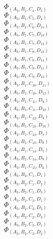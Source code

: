 \documentclass[14pt]{article}
\begin{document}
    $\Phi_{({A}_{3}, {B}_{1}, {C}_{4}, {D}_{5})}$ \\ 
    $\Phi_{({A}_{3}, {B}_{1}, {C}_{5}, {D}_{4})}$ \\ 
    $\Phi_{({A}_{3}, {B}_{1}, {C}_{6}, {D}_{15})}$ \\ 
    $\Phi_{({A}_{3}, {B}_{1}, {C}_{7}, {D}_{13})}$ \\ 
    $\Phi_{({A}_{3}, {B}_{1}, {C}_{7}, {D}_{14})}$ \\ 
    $\Phi_{({A}_{3}, {B}_{1}, {C}_{8}, {D}_{13})}$ \\ 
    $\Phi_{({A}_{3}, {B}_{1}, {C}_{8}, {D}_{14})}$ \\ 
    $\Phi_{({A}_{3}, {B}_{1}, {C}_{9}, {D}_{11})}$ \\ 
    $\Phi_{({A}_{3}, {B}_{1}, {C}_{9}, {D}_{12})}$ \\ 
    $\Phi_{({A}_{3}, {B}_{1}, {C}_{10}, {D}_{11})}$ \\ 
    $\Phi_{({A}_{3}, {B}_{1}, {C}_{10}, {D}_{12})}$ \\ 
    $\Phi_{({A}_{3}, {B}_{1}, {C}_{11}, {D}_{9})}$ \\ 
    $\Phi_{({A}_{3}, {B}_{1}, {C}_{11}, {D}_{10})}$ \\ 
    $\Phi_{({A}_{3}, {B}_{1}, {C}_{12}, {D}_{9})}$ \\ 
    $\Phi_{({A}_{3}, {B}_{1}, {C}_{12}, {D}_{10})}$ \\ 
    $\Phi_{({A}_{3}, {B}_{1}, {C}_{13}, {D}_{7})}$ \\ 
    $\Phi_{({A}_{3}, {B}_{1}, {C}_{13}, {D}_{8})}$ \\ 
    $\Phi_{({A}_{3}, {B}_{1}, {C}_{14}, {D}_{7})}$ \\ 
    $\Phi_{({A}_{3}, {B}_{1}, {C}_{14}, {D}_{8})}$ \\ 
    $\Phi_{({A}_{3}, {B}_{1}, {C}_{15}, {D}_{6})}$ \\ 
    $\Phi_{({A}_{3}, {B}_{2}, {C}_{1}, {D}_{1})}$ \\ 
    $\Phi_{({A}_{3}, {B}_{2}, {C}_{1}, {D}_{2})}$ \\ 
    $\Phi_{({A}_{3}, {B}_{2}, {C}_{1}, {D}_{3})}$ \\ 
    $\Phi_{({A}_{3}, {B}_{2}, {C}_{2}, {D}_{1})}$ \\ 
    $\Phi_{({A}_{3}, {B}_{2}, {C}_{2}, {D}_{2})}$ \\ 
    $\Phi_{({A}_{3}, {B}_{2}, {C}_{2}, {D}_{3})}$ \\ 
    $\Phi_{({A}_{3}, {B}_{2}, {C}_{3}, {D}_{1})}$ \\ 
    $\Phi_{({A}_{3}, {B}_{2}, {C}_{3}, {D}_{2})}$ \\ 
\end{document}
